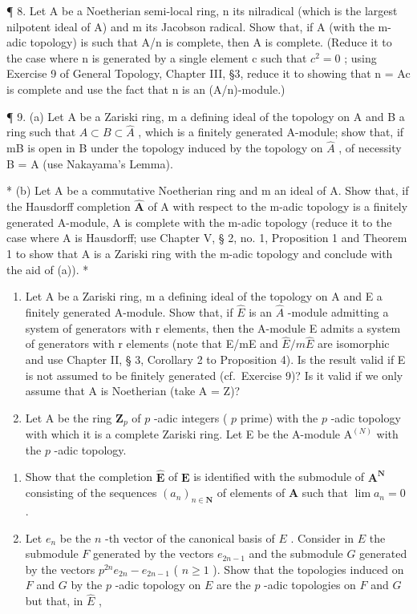 ¶ 8. Let A be a Noetherian semi-local ring, n its nilradical (which is the largest nilpotent ideal of A) and m its Jacobson radical. Show that, if A (with the m-adic topology) is such that A/n is complete, then A is complete. (Reduce it to the case where n is generated by a single element c such that \(c^{2} = 0\) ; using Exercise 9 of General Topology, Chapter III, §3, reduce it to showing that n = Ac is complete and use the fact that n is an (A/n)-module.)

¶ 9. (a) Let A be a Zariski ring, m a defining ideal of the topology on A and B a ring such that \(A \subset B \subset \hat{A}\) , which is a finitely generated A-module; show that, if mB is open in B under the topology induced by the topology on \(\hat{A}\) , of necessity B = A (use Nakayama's Lemma).

* (b) Let A be a commutative Noetherian ring and m an ideal of A. Show that, if the Hausdorff completion \(\hat{\mathbf{A}}\) of A with respect to the m-adic topology is a finitely generated A-module, A is complete with the m-adic topology (reduce it to the case where A is Hausdorff; use Chapter V, § 2, no. 1, Proposition 1 and Theorem 1 to show that A is a Zariski ring with the m-adic topology and conclude with the aid of (a)). *

\begin{enumerate}
\def\labelenumi{\arabic{enumi}.}
\setcounter{enumi}{9}
\item
  Let A be a Zariski ring, m a defining ideal of the topology on A and E a finitely generated A-module. Show that, if \(\hat{E}\) is an \(\hat{A}\) -module admitting a system of generators with r elements, then the A-module E admits a system of generators with r elements (note that E/mE and \(\hat{E}/m\hat{E}\) are isomorphic and use Chapter II, § 3, Corollary 2 to Proposition 4). Is the result valid if E is not assumed to be finitely generated (cf.~Exercise 9)? Is it valid if we only assume that A is Noetherian (take A = Z)?
\item
  Let A be the ring \(\mathbf{Z}_p\) of \(p\) -adic integers ( \(p\) prime) with the \(p\) -adic topology with which it is a complete Zariski ring. Let E be the A-module \(\mathrm{A}^{(N)}\) with the \(p\) -adic topology.
\end{enumerate}

\begin{enumerate}
\def\labelenumi{(\alph{enumi})}
\item
  Show that the completion \(\hat{\mathbf{E}}\) of \(\mathbf{E}\) is identified with the submodule of \(\mathbf{A}^{\mathbf{N}}\) consisting of the sequences \((a_{n})_{n\in \mathbf{N}}\) of elements of \(\mathbf{A}\) such that \(\lim a_n = 0\) .
\item
  Let \(e_n\) be the \(n\) -th vector of the canonical basis of \(E\) . Consider in \(E\) the submodule \(F\) generated by the vectors \(e_{2n-1}\) and the submodule \(G\) generated by the vectors \(p^{2n}e_{2n} - e_{2n-1}\) ( \(n \geqslant 1\) ). Show that the topologies induced on \(F\) and \(G\) by the \(p\) -adic topology on \(E\) are the \(p\) -adic topologies on \(F\) and \(G\) but that, in \(\hat{E}\) ,
\end{enumerate}

